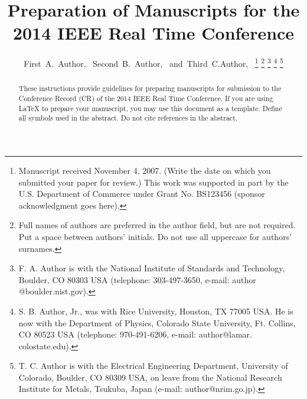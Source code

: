 \documentclass[journal]{IEEEtran}
\begin{document}
\title{Preparation of Manuscripts for the\\
2014 IEEE Real Time Conference}
%
%

\author{First~A.~Author,~
        Second~B.~Author,~
        and~Third~C.Author,~%
\thanks{Manuscript received November 4, 2007. (Write the date on which you submitted your paper for review.) This work was supported in part by the U.S. Department of Commerce under Grant No. BS123456 (sponsor acknowledgment goes here).}%
\thanks{Full names of authors are preferred in the author field, but are not required. Put a space between authors' initials. Do not use all uppercase for authors' surnames.}%
\thanks{F. A. Author is with the National Institute of Standards and Technology, Boulder, CO 80303 USA (telephone: 303-497-3650, e-mail: author @boulder.nist.gov).}%
\thanks{S. B. Author, Jr., was with Rice University, Houston, TX 77005 USA. He is now with the Department of Physics, Colorado State University, Ft. Collins, CO 80523 USA (telephone: 970-491-6206, e-mail: author@lamar. colostate.edu).}%
\thanks{T. C. Author is with the Electrical Engineering Department, University of Colorado, Boulder, CO 80309 USA, on leave from the National Research Institute for Metals, Tsukuba, Japan (e-mail: author@nrim.go.jp).}%
}

\maketitle
\thispagestyle{empty}

\begin{abstract}
These instructions provide guidelines for preparing manuscripts for submission to the Conference Record (CR) of the 2014 IEEE Real Time Conference. If you are using {\LaTeX} to prepare your manuscript, you may use this document as a template. Define all symbols used in the abstract. Do not cite references in the abstract. 
\end{abstract}

\end{document}
